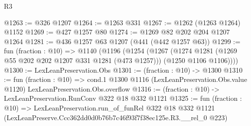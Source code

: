\begin{lexlean}{R3}
\begin{coremodule}
@1263 := @326 @1207
@1264 := @1263 @331
@1267 := @1262 (@1263 @1264) @1152
@1269 := @427 @1257 @80
@1274 := @1269 @82 @202 @204 @1207 @1264
@1281 := @436 @1257 @63 @1207 (@441 (@442 @1257 @63))
@1299 := fun (fraction : @10) =>
  @1140
    (@1196
      (@1254
        (@1267
          (@1274 @1281 (@1269 @55 @202 @202 @1207 @331 @1281 (@473 @1257)))
          (@1250 @1106 @1106))))
@1300 := LexLeanPreservation.Obs
@1301 := (fraction : @10) -> @1300
@1310 := fun (fraction : @10) =>
  cond.{1} @1300 @1116 (LexLeanPreservation.Obs.value @1120) LexLeanPreservation.Obs.overflow
@1316 := (fraction : @10) -> LexLeanPreservation.RunConv @322 @18 @332 @1121
@1325 := fun (fraction : @10) =>
  LexLeanPreservation.run_of_funRel
    @322
    @18
    @332
    @1121
    (LexLeanPreserve.Ccc362dd0d0b76b7c46f93f7f38ec125e.R3.__rel_0 @223)
\end{coremodule}
\end{lexlean}
